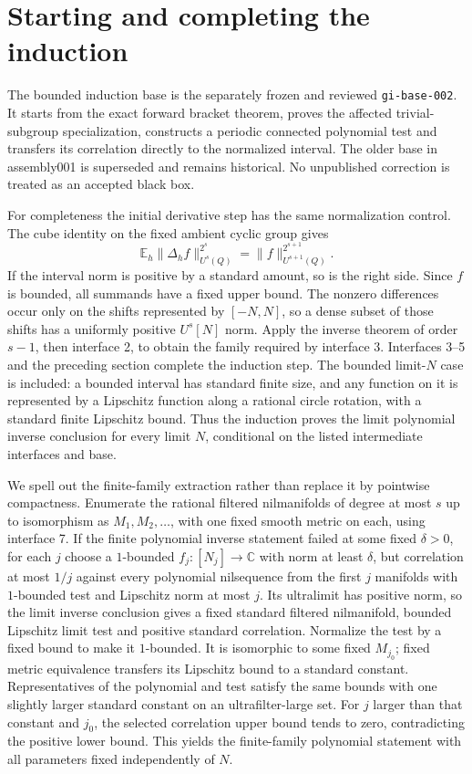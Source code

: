 \documentclass[11pt]{article}
\newcommand{\C}{\mathbb C}
\newcommand{\E}{\mathbb E}
\begin{document}
\section{Starting and completing the induction}

The bounded induction base is the separately frozen and reviewed
\texttt{gi-base-002}. It starts from the exact forward bracket theorem,
proves the affected trivial-subgroup specialization, constructs a
periodic connected polynomial test and transfers its correlation
directly to the normalized interval. The older base in assembly001
is superseded and remains historical. No unpublished correction is
treated as an accepted black box.

For completeness the initial derivative step has the same normalization
control. The cube identity on the fixed ambient cyclic group gives
\[
 \E_h\|\Delta_h f\|_{U^s(Q)}^{2^s}
 =\|f\|_{U^{s+1}(Q)}^{2^{s+1}}.
\]
If the interval norm is positive by a standard amount, so is the right
side. Since $f$ is bounded, all summands have a fixed upper bound. The
nonzero differences occur only on the shifts represented by $[-N,N]$,
so a dense subset of those shifts has a uniformly positive $U^s[N]$
norm. Apply the inverse theorem of order $s-1$, then interface 2, to
obtain the family required by interface 3. Interfaces 3--5 and the preceding
section complete the induction step. The bounded limit-$N$ case is included:
a bounded interval has standard finite size, and any function on it is
represented by a Lipschitz function along a rational circle rotation,
with a standard finite Lipschitz bound. Thus the induction proves the
limit polynomial inverse conclusion for every limit $N$, conditional on
the listed intermediate interfaces and base.

We spell out the finite-family extraction rather than replace it by
pointwise compactness. Enumerate the rational filtered nilmanifolds of
degree at most $s$ up to isomorphism as $M_1,M_2,\ldots$, with one fixed
smooth metric on each, using interface 7. If the finite polynomial inverse
statement failed at some fixed $\delta>0$, for each $j$ choose a
$1$-bounded $f_j:[N_j]\to\C$ with norm at least $\delta$, but correlation
at most $1/j$ against every polynomial nilsequence from the first $j$
manifolds with $1$-bounded test and Lipschitz norm at most $j$.
Its ultralimit has positive norm, so the limit inverse conclusion gives a
fixed standard filtered nilmanifold, bounded Lipschitz limit test and
positive standard correlation. Normalize the test by a fixed bound to
make it $1$-bounded. It is isomorphic to some fixed $M_{j_0}$; fixed
metric equivalence transfers its Lipschitz bound to a standard constant.
Representatives of the polynomial and test satisfy the same bounds with
one slightly larger standard constant on an ultrafilter-large set.
For $j$ larger than that constant and $j_0$, the selected correlation
upper bound tends to zero, contradicting the positive lower bound.
This yields the finite-family polynomial statement with all parameters
fixed independently of $N$.
\end{document}
